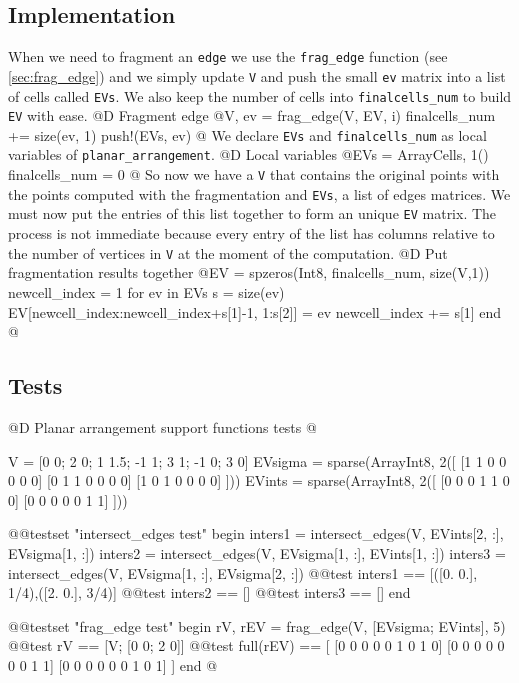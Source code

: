 \documentclass[10pt,oneside]{article}
\begin{document}
\subsection{Implementation}
When we need to fragment an \texttt{edge} we use the \texttt{frag\_edge} function (see \ref{sec:frag_edge}) 
and we simply update \texttt{V} and push the small \texttt{ev} matrix into a list of cells called \texttt{EVs}.
We also keep the number of cells into \texttt{finalcells\_num} to build \texttt{EV} with ease.
@D Fragment edge
@{V, ev = frag_edge(V, EV, i)
finalcells_num += size(ev, 1)
push!(EVs, ev)
@}
We declare \texttt{EVs} and \texttt{finalcells\_num} as local variables of \texttt{planar\_arrangement}.
@D Local variables
@{EVs = Array{Cells, 1}()
finalcells_num = 0
@}
So now we have a \texttt{V} that contains the original points with the points computed with the fragmentation
and \texttt{EVs}, a list of edges matrices. We must now put the entries of this list together to form an unique
\texttt{EV} matrix. The process is not immediate because every entry of the list has columns relative to the 
number of vertices in \texttt{V} at the moment of the computation.
@D Put fragmentation results together
@{EV = spzeros(Int8, finalcells_num, size(V,1))
newcell_index = 1
for ev in EVs
    s = size(ev)
    EV[newcell_index:newcell_index+s[1]-1, 1:s[2]] = ev
    newcell_index += s[1]
end
@}
\subsection{Tests}
@D Planar arrangement support functions tests
@{V = [0 0; 2 0; 1 1.5; -1 1; 3 1; -1 0; 3 0]
EVsigma = sparse(Array{Int8, 2}([
    [1 1 0 0 0 0 0]
    [0 1 1 0 0 0 0]
    [1 0 1 0 0 0 0]
]))
EVints = sparse(Array{Int8, 2}([
    [0 0 0 1 1 0 0]
    [0 0 0 0 0 1 1]
]))

@@testset "intersect_edges test" begin
    inters1 = intersect_edges(V, EVints[2, :], EVsigma[1, :])
    inters2 = intersect_edges(V, EVsigma[1, :], EVints[1, :])
    inters3 = intersect_edges(V, EVsigma[1, :], EVsigma[2, :])
    @@test inters1 == [([0. 0.], 1/4),([2. 0.], 3/4)]
    @@test inters2 == []
    @@test inters3 == []
end

@@testset "frag_edge test" begin
    rV, rEV = frag_edge(V, [EVsigma; EVints], 5)
    @@test rV == [V; [0 0; 2 0]]
    @@test full(rEV) == [
        [0 0 0 0 0 1 0 1 0]
        [0 0 0 0 0 0 0 1 1]
        [0 0 0 0 0 0 1 0 1]
    ]
end
@}
\end{document}
